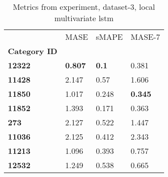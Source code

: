 \begin{table}[H]
\centering
\caption{Metrics from experiment, dataset-3, local multivariate lstm}
\label{table:local-multivariate-lstm-dataset-3}
\begin{tabular}{llll}
\toprule
{} &            MASE &         sMAPE &          MASE-7 \\
\textbf{Category ID} &                 &               &                 \\
\midrule
\textbf{12322      } &  \textbf{0.807} &  \textbf{0.1} &           0.381 \\
\textbf{11428      } &           2.147 &          0.57 &           1.606 \\
\textbf{11850      } &           1.017 &         0.248 &  \textbf{0.345} \\
\textbf{11852      } &           1.393 &         0.171 &           0.363 \\
\textbf{273        } &           2.127 &         0.522 &           1.447 \\
\textbf{11036      } &           2.125 &         0.412 &           2.343 \\
\textbf{11213      } &           1.096 &         0.393 &           0.757 \\
\textbf{12532      } &           1.249 &         0.538 &           0.665 \\
\bottomrule
\end{tabular}
\end{table}
